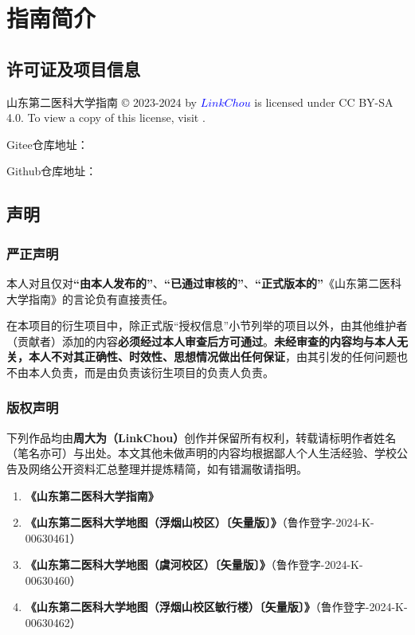 \chapter[指南简介]{指南简介}

\section[许可证及项目信息]{许可证及项目信息}
山东第二医科大学指南 © 2023-2024 by \textcolor{blue}{$LinkChou$} is licensed under CC BY-SA 4.0. To view a copy of this license, visit .

Gitee仓库地址：

Github仓库地址：

\section[声明]{声明}
\label{copyright}
\subsection[严正声明]{严正声明}
本人对且仅对\textbf{“由本人发布的”}、\textbf{“已通过审核的”}、\textbf{“正式版本的”}《山东第二医科大学指南》的言论负有直接责任。

在本项目的衍生项目中，除正式版“授权信息”小节列举的项目以外，由其他维护者（贡献者）添加的内容\textbf{必须经过本人审查后方可通过}。\textbf{未经审查的内容均与本人无关，本人不对其正确性、时效性、思想情况做出任何保证}，由其引发的任何问题也不由本人负责，而是由负责该衍生项目的负责人负责。

\subsection[版权声明]{版权声明}
下列作品均由\textbf{周大为（LinkChou）}创作并保留所有权利，转载请标明作者姓名（笔名亦可）与出处。本文其他未做声明的内容均根据鄙人个人生活经验、学校公告及网络公开资料汇总整理并提炼精简，如有错漏敬请指明。

\begin{enumerate}
    \item \textbf{《山东第二医科大学指南》}
    \item \textbf{《山东第二医科大学地图（浮烟山校区）〔矢量版〕》}（鲁作登字-2024-K-00630461）
    \item \textbf{《山东第二医科大学地图（虞河校区）〔矢量版〕》}（鲁作登字-2024-K-00630460）
    \item \textbf{《山东第二医科大学地图（浮烟山校区敏行楼）〔矢量版〕》}（鲁作登字-2024-K-00630462）
\end{enumerate}


